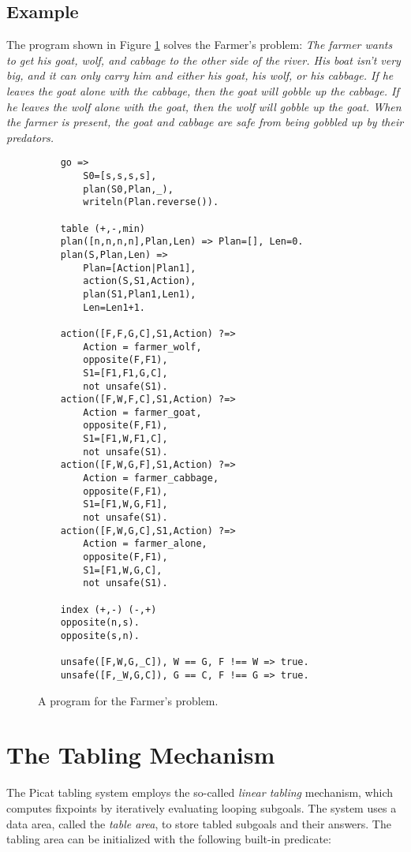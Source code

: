 \subsection*{Example}
The program shown in Figure \ref{fig:farmer} solves the Farmer's problem: {\em The farmer wants to get his goat, wolf, and cabbage to the other side of the river. His boat isn't very big, and it can only carry him and either his goat, his wolf, or his cabbage. If he leaves the goat alone with the cabbage, then the goat will gobble up the cabbage. If he leaves the wolf alone with the goat, then the wolf will gobble up the goat. When the farmer is present, the goat and cabbage are safe from being gobbled up by their predators.}


\begin{figure}
\begin{center}
\begin{verbatim}
    go =>
        S0=[s,s,s,s],
        plan(S0,Plan,_),
        writeln(Plan.reverse()).

    table (+,-,min)
    plan([n,n,n,n],Plan,Len) => Plan=[], Len=0.
    plan(S,Plan,Len) =>
        Plan=[Action|Plan1],
        action(S,S1,Action),
        plan(S1,Plan1,Len1),
        Len=Len1+1.
    
    action([F,F,G,C],S1,Action) ?=>
        Action = farmer_wolf,
        opposite(F,F1),
        S1=[F1,F1,G,C],
        not unsafe(S1).
    action([F,W,F,C],S1,Action) ?=>
        Action = farmer_goat,
        opposite(F,F1),
        S1=[F1,W,F1,C],
        not unsafe(S1).
    action([F,W,G,F],S1,Action) ?=>
        Action = farmer_cabbage,
        opposite(F,F1),
        S1=[F1,W,G,F1],
        not unsafe(S1).
    action([F,W,G,C],S1,Action) ?=>
        Action = farmer_alone,
        opposite(F,F1),
        S1=[F1,W,G,C],
        not unsafe(S1).

    index (+,-) (-,+)
    opposite(n,s).
    opposite(s,n).

    unsafe([F,W,G,_C]), W == G, F !== W => true.
    unsafe([F,_W,G,C]), G == C, F !== G => true.
\end{verbatim}
\end{center}
\caption{\label{fig:farmer}A program for the Farmer's problem.}
\end{figure}

\section{The Tabling Mechanism}
The Picat tabling system employs the so-called \emph{linear tabling} mechanism, which computes fixpoints by iteratively evaluating looping subgoals. The system uses a data area, called the \emph{table area}, to store tabled subgoals and their answers. The tabling area can be initialized with the following built-in predicate:

